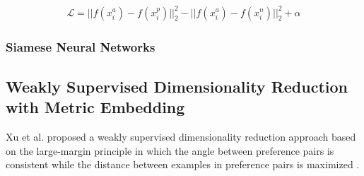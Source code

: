 		\begin{align}
			\mathcal{L} = ||f(x^{a}_{i}) - f(x^{p}_{i})||^{2}_{2} -||f(x^{a}_{i}) - f(x^{n}_{i})||^{2}_{2} + \alpha
		\end{align}
		
		
		\subsubsection{Siamese Neural Networks}
		
	\subsection{Weakly Supervised Dimensionality Reduction with Metric Embedding}
	Xu et al. proposed a weakly supervised dimensionality reduction approach based on the large-margin principle in which the angle between preference pairs is consistent while the distance between examples in preference pairs is maximized \citep{Xu2014LargeMarginWeaklySupervisedDR}.
	





